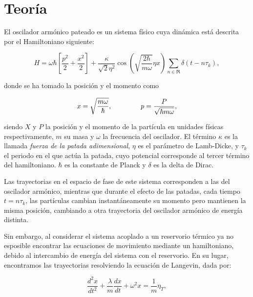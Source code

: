 \documentclass[letterpaper,12pt,oneside]{book}
\begin{document}
	\chapter{Teoría}
	
	El oscilador arm\'onico pateado es un sistema f\'isico cuya din\'amica est\'a descrita por el Hamiltoniano siguiente:
	
	\begin{equation}\label{Hamiltoniano}
		H = \omega \hbar \left[ \frac{p^2}{2} + \frac{x^2}{2} \right] + \frac{\kappa}{\sqrt{2}\eta^2} \cos \left( \sqrt{\frac{2\hbar}{m\omega}}\eta x  \right) \sum_{n\in\Re}\delta(t - n\tau_k),
	\end{equation}
	
	\noindent donde se ha tomado la posici\'on y el momento como 
	
	\begin{equation}\label{CambioVariables}
		x = \sqrt{\frac{m\omega}{\hbar}}, \verb|        | p = \frac{P}{\sqrt{\hbar m \omega}},
	\end{equation}
	
	\noindent siendo $X$ y $P$ la posici\'on y el momento de la part\'icula en unidades f\'isicas respectivamente, $m$ su masa y $\omega$ la frecuencia del oscilador. El t\'ermino $\kappa$ es la llamada \textit{fuerza de la patada adimensional}, $\eta$ es el par\'ametro de Lamb-Dicke, y $\tau_k$ el periodo en el que act\'ua la patada, cuyo potencial corresponde al tercer t\'ermino del hamiltoniano. $\hbar$ es la constante de Planck y $\delta$ es la delta de Dirac.
	
	Las trayectorias en el espacio de fase de este sistema corresponden a las del oscilador arm\'onico, mientras que durante el efecto de las patadas, cada tiempo $t = n\tau_k$, las part\'iculas cambian instant\'aneamente su momento pero mantienen la misma posici\'on, cambiando a otra trayectoria del oscilador arm\'onico de energ\'ia distinta.
	
	Sin embargo, al considerar el sistema acoplado a un reservorio t\'ermico ya no esposible encontrar las ecuaciones de movimiento mediante un hamiltoniano, debido al intercambio de energ\'ia del sistema con el reservorio. En su lugar, encontramos las trayectorias resolviendo la ecuaci\'on de Langevin, dada por: 
	
	\begin{equation}\label{LangevinOriginal}
		\frac{d^2x}{dt^2} + \frac{\lambda}{m}\frac{dx}{dt} + \omega^2 x = \frac{1}{m}\eta_T,
	\end{equation}
	
\end{document}
